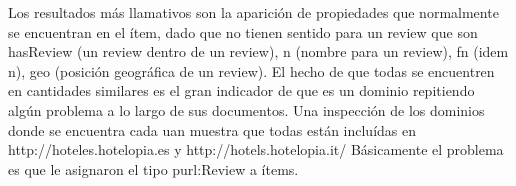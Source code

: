 Los resultados más llamativos son la aparición de propiedades que normalmente se encuentran en el ítem, dado que no tienen sentido para un review
que son hasReview (un review dentro de un review), n (nombre para un review), fn (idem n), geo (posición geográfica de un review).
El hecho de que todas se encuentren en cantidades similares es el gran indicador de que es un dominio repitiendo algún problema a lo largo de sus documentos.
Una inspección de los dominios donde se encuentra cada uan muestra que todas están incluídas en http://hoteles.hotelopia.es y http://hotels.hotelopia.it/
Básicamente el problema es que le asignaron el tipo purl:Review a ítems.
 




